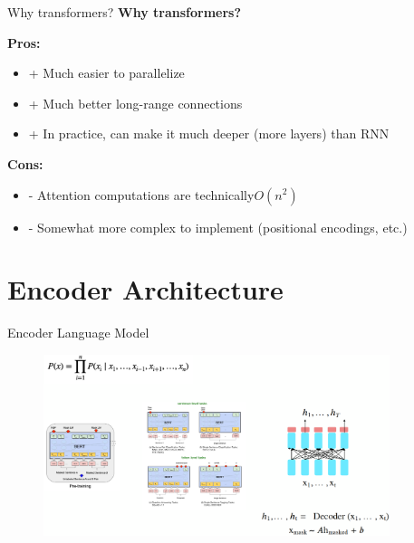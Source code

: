 \documentclass[serif, aspectratio=169]{beamer}
\begin{document}
\begin{frame}{Why transformers?}
    \Huge
    \textbf{Why transformers?}
    
    \vspace{0.5cm}
    
    \large
    \textbf{Pros:}
    \begin{itemize}
        \item[] {\color[rgb]{0,0.5,0}+ Much easier to parallelize}
        \item[] {\color[rgb]{0,0.5,0}+ Much better long-range connections}
        \item[] {\color[rgb]{0,0.5,0}+ In practice, can make it much deeper (more layers) than RNN}
    \end{itemize}
    
    \vspace{0.5cm}
    
    \textbf{Cons:}
    \begin{itemize}
        \item[] {\color{red}- Attention computations are technically$O(n^2)$}
        \item[] {\color{red}- Somewhat more complex to implement (positional encodings, etc.)}
    \end{itemize}
\end{frame}

\section{Encoder Architecture}

\begin{frame}{Encoder Language Model}
    \begin{figure}
        \centering
        \includegraphics[width=0.9\textwidth]{Figures/encoderlm.png}
    \end{figure}
\end{frame}
\end{document}
